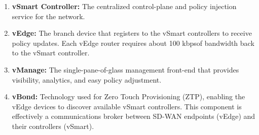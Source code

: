 \begin{enumerate}
  \item \textbf{vSmart Controller:} The centralized control-plane and policy
  injection service for the network.
  \item \textbf{vEdge:} The branch device that registers to the vSmart
  controllers to receive policy updates. Each vEdge router requires about 100
  kbpsof bandwidth back to the vSmart controller.
  \item \textbf{vManage:} The single-pane-of-glass management front-end that
  provides visibility, analytics, and easy policy adjustment.
  \item \textbf{vBond:} Technology used for Zero Touch Provisioning (ZTP),
  enabling the vEdge devices to discover available vSmart controllers. This
  component is effectively a communications broker between SD-WAN endpoints
  (vEdge) and their controllers (vSmart).
\end{enumerate}


